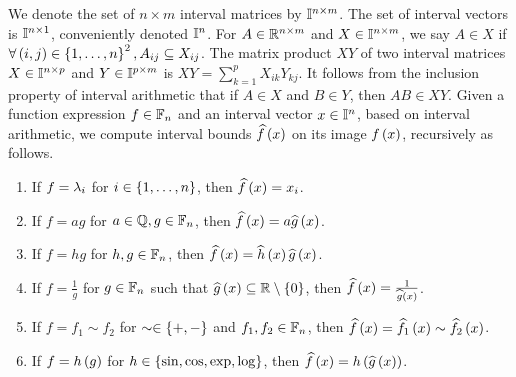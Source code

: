 We denote the set of $n\times m$ interval matrices by $\mathbb{I}^{n\times m}$.
The set of interval vectors is $\mathbb{I}^{n\times 1}$, conveniently
denoted $\mathbb{I}^{n}$.  For $A\in\mathbb{R}^{n\times m}$ and
$X\in\mathbb{I}^{n\times m}$, we say $A\in X$ if
$\forall \left(i,j\right)\in\left\{1,\ldots,n\right\}^2, A_{ij}\subseteq X_{ij}$.  The
matrix product $XY$ of two interval matrices $X\in\mathbb{I}^{n\times
p}$ and $Y\in\mathbb{I}^{p\times m}$ is $XY
= \sum_{k=1}^pX_{ik}Y_{kj}$.  It follows from the inclusion property
of interval arithmetic that if $A\in X$ and $B\in Y$, then $AB\in XY$.
Given a function expression $f\in\mathbb{F}_{n}$ and an interval vector
$x\in\mathbb{I}^n$, based on interval arithmetic, we compute interval
bounds $\widehat{f}\left(x\right)$ on its image $f\left(x\right)$, recursively as follows.
%
\begin{enumerate}
\item If $f = \lambda_{i}$ for $i\in\left\{1,\ldots,n\right\}$, then $\widehat{f}\left(x\right) =
x_i$.
\item If $f = ag$ for $a\in\mathbb{Q}, g\in\mathbb{F}_{n}$, then $\widehat{f}\left(x\right) =
a\widehat{g}\left(x\right)$.
\item If $f = hg$ for $h,g\in\mathbb{F}_{n}$, then $\widehat{f}\left(x\right)
= \widehat{h}\left(x\right)\widehat{g}\left(x\right)$.
\item If $f = \frac{1}{g}$ for $g\in\mathbb{F}_{n}$ such that
$\widehat{g}\left(x\right)\subseteq\mathbb{R}\setminus \left\{0\right\}$, then $\widehat{f}\left(x\right)
= \frac{1}{\widehat{g}\left(x\right)}$.
\item If $f = f_1\sim f_2$ for $\sim\in\left\{+,-\right\}$ and
$f_1,f_2\in\mathbb{F}_{n}$, then $\widehat{f}\left(x\right) = \widehat{f_1}\left(x\right)\sim\widehat{f_2}\left(x\right)$.
\item If $f = h\left(g\right)$ for $h\in\left\{\sin, \cos, \exp, \log\right\}$, then
$\widehat{f}\left(x\right) = h\left(\widehat{g}\left(x\right)\right)$.
\end{enumerate}
%


